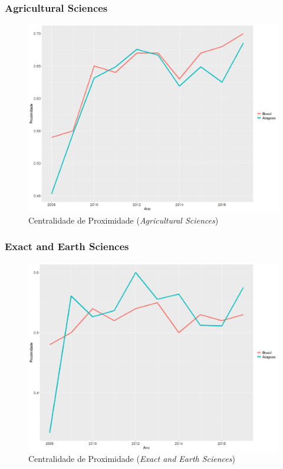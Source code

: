 \subsubsection{Agricultural Sciences}

\begin{figure}[H]
	\centering
	\includegraphics[scale=0.6]{Imagens/agricultural/graf-linha-closeness-br-al.pdf}
	\caption{Centralidade de Proximidade (\textit{Agricultural Sciences})}
	\label{close-agri}
\end{figure}

\subsubsection{Exact and Earth Sciences}

\begin{figure}[H]
	\centering
	\includegraphics[scale=0.6]{Imagens/exact/graf-linha-closeness-br-al.pdf}
	\caption{Centralidade de Proximidade (\textit{Exact and Earth Sciences})}
	\label{close-exact}
\end{figure}

